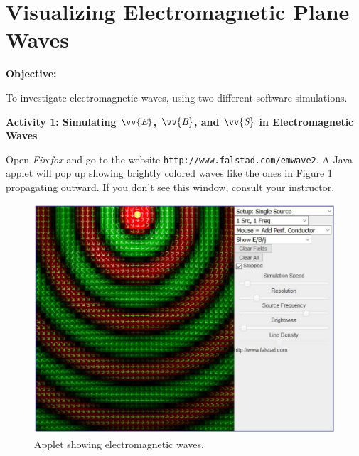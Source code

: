 \section{Visualizing Electromagnetic Plane Waves}

\makelabheader %

\bigskip
\textbf{Objective:} 


To investigate electromagnetic waves, using two different software simulations.


\bigskip

\textbf{Activity 1: Simulating $\vv{\textit{E}}$, $\vv{\textit{B}}$, and $\vv{\textit{S}}$ in Electromagnetic Waves}


Open \textit{Firefox} and go to the website
\verb!http://www.falstad.com/emwave2!. A Java applet will pop up showing
brightly colored waves like the ones in Figure 1 propagating outward. 
If you don't see this window, consult your instructor.
\begin{figure}[hbt]
\begin{center}
\includegraphics[width=6.0in]{plane_waves/falstad_screen.pdf}
\caption{Applet showing electromagnetic waves.}
\end{center}
\end{figure}

